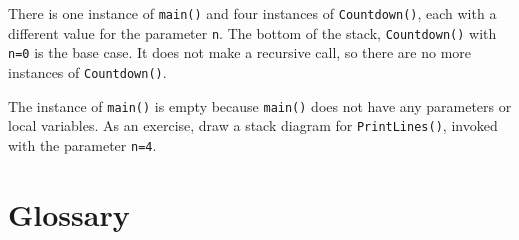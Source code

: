\vspace{0.1in}
\centerline{}
\vspace{0.1in}
%
There is one instance of {\tt main()} and four instances of
{\tt Countdown()}, each with a different value for the parameter
{\tt n}.  The bottom of the stack, {\tt Countdown()} with {\tt n=0}
is the base case.  It does not make a recursive call, so there
are no more instances of {\tt Countdown()}.

The instance of {\tt main()} is empty because {\tt main()} does not
have any parameters or local variables.  As an exercise, draw a
stack diagram for {\tt PrintLines()}, invoked with the parameter {\tt n=4}.


\section{Glossary}

